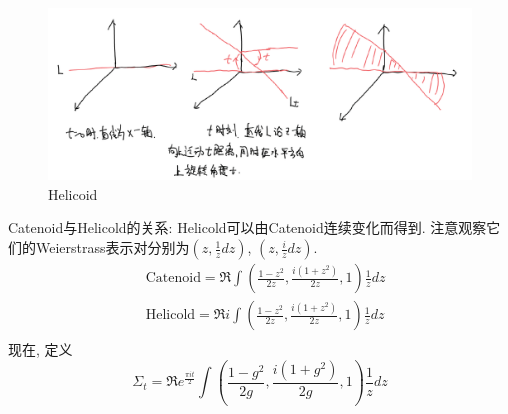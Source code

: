 \begin{figure}[ht]
	\centering
	\includegraphics[scale=0.5]{images/helicoid.png}
	\caption{Helicoid}
	\label{helicoidp}
\end{figure}
\par Catenoid与Helicold的关系: Helicold可以由Catenoid连续变化而得到. 注意观察它们的Weierstrass表示对分别为$(z,\frac{1}{z}dz)$, $(z,\frac{i}{z}dz)$.
\begin{align}
    &\text{Catenoid}= \Re \int (\frac{1-z^2}{2z}, \frac{i(1+z^2)}{2z},1)\frac{1}{z}dz \\
    &\text{Helicold}= \Re i \int (\frac{1-z^2}{2z}, \frac{i(1+z^2)}{2z},1)\frac{1}{z}dz \\
\end{align}
现在, 定义
\begin{equation}
    \Sigma_t= \Re e^{\frac{\pi it}{2}} \int (\frac{1-g^2}{2g}, \frac{i(1+g^2)}{2g},1)\frac{1}{z}dz 
\end{equation}

